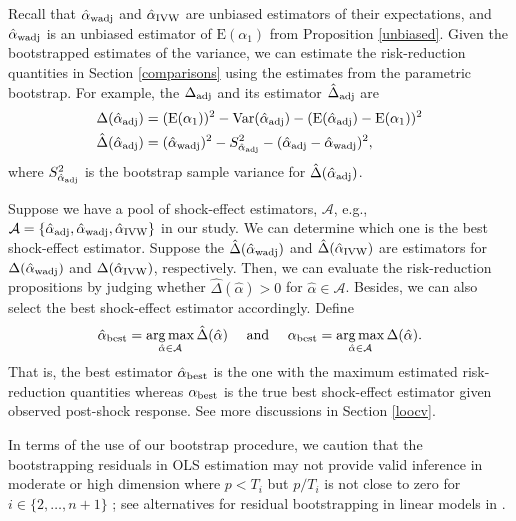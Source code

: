 \documentclass[11pt]{article}
\def\mc#1{\mathcal{#1}} %
\DeclareMathOperator*{\argmax}{arg\,max} %
\def\E#1{\mathrm{E}(#1)} %
\def\var#1{\mathrm{Var}(#1)} %
\theoremstyle{definition}
\begin{document}
Recall that  $\hat{\alpha}_{\rm wadj}$ and $\hat{\alpha}_{\rm IVW}$ are unbiased estimators of their expectations, and $\hat{\alpha}_{\rm wadj}$ is an unbiased estimator of $\E{\alpha_1}$ from Proposition \ref{unbiased}. Given the bootstrapped estimates of the variance, we can estimate the risk-reduction quantities in Section \ref{comparisons} using the estimates from the parametric bootstrap. For example, the $\Delta_{\rm adj}$ and its estimator $\hat{\Delta}_{\rm adj}$ are
\begin{align*}
  \Delta(\hat{\alpha}_{\rm adj})
  &= (\E{\alpha_1})^2 -\var{\hat{\alpha}_{\rm adj}} -(\E{\hat{\alpha}_{\rm adj}}-\E{\alpha_1})^2 \\
  \hat{\Delta}(\hat{\alpha}_{\rm adj})
 & = (\hat{\alpha}_{\rm wadj})^2 -S^2_{\hat{\alpha}_{\rm adj}} -(\hat{\alpha}_{\rm adj}-\hat{\alpha}_{\rm wadj})^2,
\end{align*}
where $S^2_{\hat{\alpha}_{\rm adj}}$ is the bootstrap sample variance for $\hat{\Delta}(\hat{\alpha}_{\rm adj})$. 

Suppose we have a pool of shock-effect estimators, $\mc{A}$, e.g., $\mc{A}= \{\hat{\alpha}_{\rm adj}, \hat{\alpha}_{\rm wadj}, \hat{\alpha}_{\rm IVW}\}$ in our study. We can determine which one is the best shock-effect estimator. Suppose the $\hat{\Delta}(\hat{\alpha}_{\rm wadj})$ and $\hat{\Delta}(\hat{\alpha}_{\rm IVW})$ are estimators for $\Delta(\hat{\alpha}_{\rm wadj}) $ and $\Delta(\hat{\alpha}_{\rm IVW})$, respectively. Then, we can evaluate the risk-reduction propositions by judging whether $\hat{\Delta}(\hat{\alpha})>0$ for $\hat{\alpha}\in \mc{A}$. Besides, we can also select the best shock-effect estimator accordingly. Define
\begin{align}
	\hat{\alpha}_{\rm best} = \argmax_{\hat{\alpha}\in \mc{A}} \hat{\Delta}(\hat{\alpha}) \quad \text{ and } \quad  \alpha_{\rm best} = \argmax_{\hat{\alpha}\in \mc{A}} \Delta(\hat{\alpha}). \label{best}
\end{align}
That is, the best estimator $\hat{\alpha}_{\rm best}$ is the one with the maximum estimated risk-reduction quantities whereas $\alpha_{\rm best}$ is the true best shock-effect estimator given observed post-shock response. See more discussions in Section \ref{loocv}.



In terms of the use of our bootstrap procedure, we caution that the bootstrapping residuals in OLS estimation may not provide valid inference in moderate or high dimension where $p < T_i$ but $p / T_i$ is not close to zero for $i\in \{2, \ldots, n+1\}$ \citep{el2018can}; see alternatives for residual bootstrapping in linear models in \citet{el2018can}.
\end{document}
